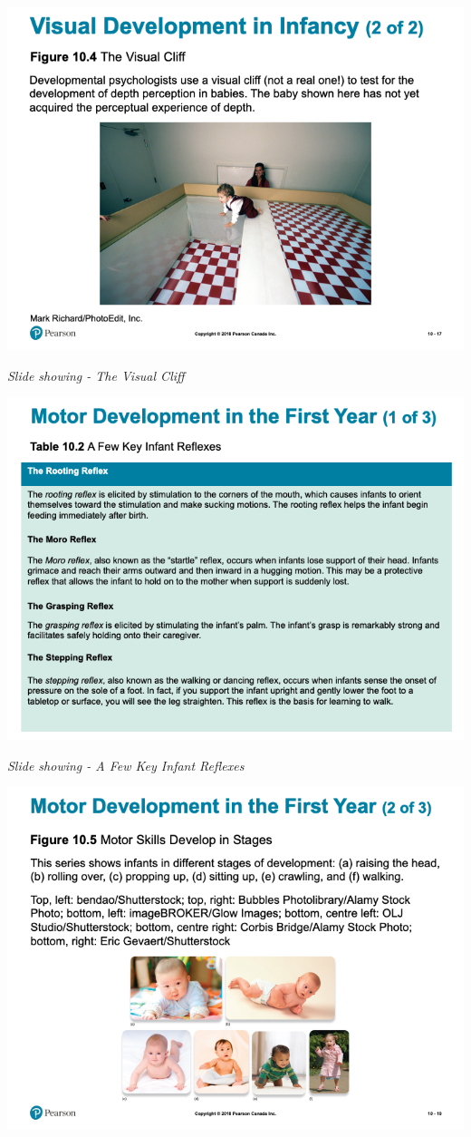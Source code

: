 \documentclass[
]{book}
\begin{document}
\begin{reflect}
\includegraphics{assets/unit_3/slide_17.png}

\emph{Slide showing - The Visual Cliff}

\includegraphics{assets/unit_3/slide_18.png}

\emph{Slide showing - A Few Key Infant Reflexes}

\includegraphics{assets/unit_3/slide_19.png}


\end{reflect}
\end{document}
